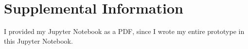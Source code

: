 \chapter{Supplemental Information}\label{app:supplemental-information}

I provided my Jupyter Notebook as a PDF, since I wrote my entire prototype in this Jupyter Notebook. 



